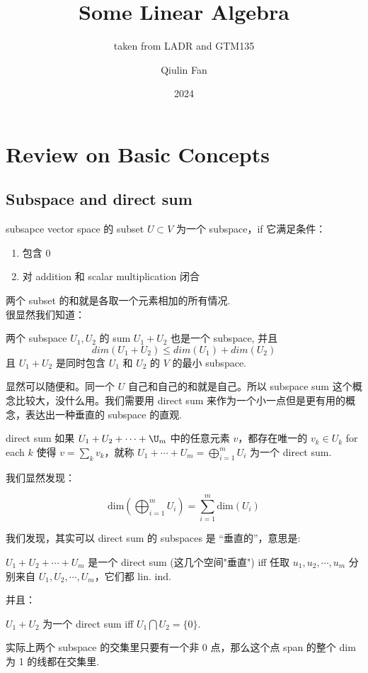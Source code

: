 \documentclass[lang=cn,11pt]{elegantbook}
\title{Some Linear Algebra}
\subtitle{taken from LADR and GTM135}
\author{Qiulin Fan}
\date{2024}
\begin{document}
\maketitle
\frontmatter
\tableofcontents

\mainmatter
\chapter{Review on Basic Concepts}
\section{Subspace and direct sum}
\begin{definition}{subsapce} \label{subspace}
vector space 的 subset $U \subset V$ 为一个 subspace，if 它满足条件：
\begin{enumerate}
    \item 包含 0
    \item 对 addition 和 scalar multiplication 闭合
\end{enumerate}
\end{definition}
两个 subset 的和就是各取一个元素相加的所有情况.\\
很显然我们知道：
\begin{proposition}
两个 subspace $U_1, U_2$ 的 sum $U_1 + U_2$ 也是一个 subspace, 并且 
$$
dim(U_1 + U_2) \leq dim(U_1) + dim(U_2)
$$
且 $U_1 + U_2$ 是同时包含 $U_1$ 和 $U_2$ 的 $V $ 的最小 subspace.
\end{proposition}

显然可以随便和。同一个 $U$ 自己和自己的和就是自己。所以 subspace sum 这个概念比较大，没什么用。我们需要用 direct sum 来作为一个小一点但是更有用的概念，表达出一种垂直的 subspace 的直观.

\begin{definition}{direct sum} \label{direct sum}
如果 $U_1 + U_2 + \cdots + \U_m$ 中的任意元素 $v$，都存在唯一的 $v_k \in U_k$ for each $k$ 使得 $v = \sum_{k}v_k$，就称 $U_1 + \cdots + U_m = \bigoplus_{i = 1}^m U_i$ 为一个 direct sum.
\end{definition}

我们显然发现：
\begin{proposition}
    $$
    \text{dim}(\bigoplus_{i = 1}^m U_i) = \sum_{i = 1}^m \text{dim}(U_i) 
    $$
\end{proposition}

我们发现，其实可以 direct sum 的 subspaces 是 “垂直的”，意思是:
\begin{theorem}
    $U_1 + U_2 + \cdots + U_m$ 是一个 direct sum (这几个空间"垂直") iff 任取 $u_1, u_2, \cdots, u_m$ 分别来自 $U_1,  U_2 , \cdots, U_m$，它们都 lin. ind.
\end{theorem}
并且：
\begin{theorem}
    $U_1 + U_2$ 为一个 direct sum iff $U_1 \bigcap U_2 = \{0\}$.
\end{theorem}
\begin{remark}
实际上两个 subspace 的交集里只要有一个非 0 点，那么这个点 span 的整个 dim 为 1 的线都在交集里.
\end{remark}
\end{document}
